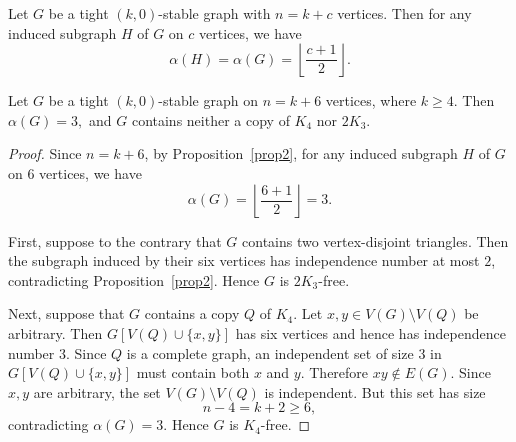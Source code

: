 \documentclass[10pt,a4paper]{amsart}
\begin{document}
\begin{Proposition}\label{prop2}
	Let $G$ be a tight $(k,0)$-stable graph with $n = k+c$ vertices. Then for any induced subgraph $H$ of $G$ on $c$ vertices, we have
	$$\alpha(H) = \alpha(G) = \left\lfloor \frac{c+1}{2} \right\rfloor.$$
\end{Proposition}

\begin{lem}\label{lem:c6}
	Let $G$ be a tight $(k,0)$-stable graph on $n=k+6$ vertices, where $ k\ge4 $. Then $	\alpha(G)=3,$ and $G$ contains neither a copy of $K_4$ nor $2K_3$.
\end{lem}

\begin{proof}
	Since $n=k+6$, by Proposition~\ref{prop2}, for any induced subgraph $ H $ of $ G $ on $ 6 $ vertices, we have
	\[
	\alpha(G)=\left\lfloor \frac{6+1}{2}\right\rfloor=3.
	\]
	
	First, suppose to the contrary that $G$ contains two vertex-disjoint triangles. Then the
	subgraph induced by their six vertices has independence number at most
	$2$, contradicting Proposition~\ref{prop2}. Hence $G$ is
	$2K_3$-free.
	
	Next, suppose that $G$ contains a copy $Q$ of $K_4$. Let
	$x,y\in V(G)\setminus V(Q)$ be arbitrary. Then $G[V(Q)\cup\{x,y\}]$ has
	six vertices and hence has independence number $3$. Since $Q$ is a
	complete graph, an independent set of size $3$ in
	$G[V(Q)\cup\{x,y\}]$ must contain both $x$ and $y$. Therefore
	$xy\notin E(G)$. Since $x,y$ are arbitrary, the set
	$V(G)\setminus V(Q)$ is independent. But this set has size
	\[
	n-4=k+2\geq 6,
	\]
	contradicting $\alpha(G)=3$. Hence $G$ is $K_4$-free.
\end{proof}
\end{document}

